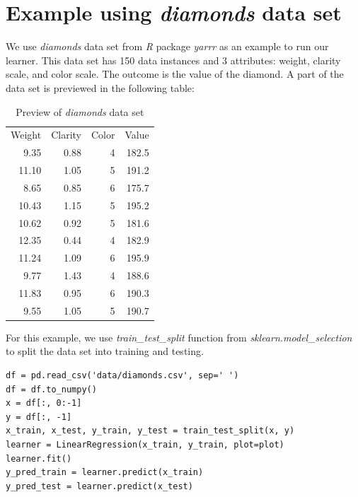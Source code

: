 \documentclass[
	letterpaper
]{article}
\begin{document}
\section{Example using \textit{diamonds} data set}
We use \textit{diamonds} data set from \textit{R} package \textit{yarrr} as an example to run our learner.
This data set has 150 data instances and 3 attributes: weight, clarity scale, and color scale.
The outcome is the value of the diamond.
A part of the data set is previewed in the following table:
\begin{table}[htbp]
	\small 
	\centering 
		\caption{Preview of \textit{diamonds} data set}
		\label{table:diamonds}
	\begin{tabular}{r r r|r}
		Weight & Clarity & Color & Value \\
9.35	&		0.88	&		4		&	  182.5\\
11.10	&   1.05	&		5		&  191.2\\
8.65	&		0.85	&		6		&  175.7\\
10.43	&		1.15	& 	5		&  195.2\\
10.62	&		0.92	&		5		&  181.6\\
12.35	&		0.44	&		4		&  182.9\\
11.24	&		1.09	& 	6		&  195.9\\
9.77	&		1.43	&		4		&  188.6\\
11.83	& 	0.95	&		6		&  190.3\\
9.55	&		1.05	&		5		&  190.7\\
	\end{tabular}
 \end{table}
 
For this example, we use \textit{train\_test\_split} function from \textit{sklearn.model\_selection} to split the data set into training and testing.
\begin{lstlisting}
df = pd.read_csv('data/diamonds.csv', sep=' ')
df = df.to_numpy()
x = df[:, 0:-1]
y = df[:, -1]
x_train, x_test, y_train, y_test = train_test_split(x, y)
learner = LinearRegression(x_train, y_train, plot=plot)
learner.fit()
y_pred_train = learner.predict(x_train)
y_pred_test = learner.predict(x_test)
\end{lstlisting}
\end{document}
